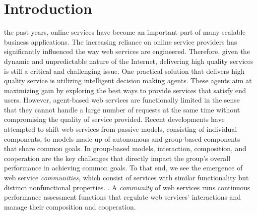 \documentclass[10pt,journal,cspaper,compsoc]{IEEEtran}
\begin{document}
\maketitle


\IEEEdisplaynotcompsoctitleabstractindextext


%
\IEEEpeerreviewmaketitle


\section{Introduction}

 the past years, online services have become an important part of many scalable business applications. The increasing reliance on online service providers has significantly influenced the way web services are engineered. Therefore, given the dynamic and unpredictable nature of the Internet, delivering high quality services is still a critical and challenging issue. One practical solution that delivers high quality service is utilizing intelligent decision making agents. These agents aim at maximizing gain by exploring the best ways to provide services that satisfy end users. However, agent-based web services are functionally limited in the sense that they cannot handle a large number of requests at the same time without compromising the quality of service provided. Recent developments have attempted to shift web services from passive models, consisting of individual components, to models made up of autonomous and group-based components that share common goals. In group-based models, interaction, composition, and cooperation are the key challenges \cite{ICWS2011-1, SCC2011-1, journals/mags/BaldoniBM10, journals/jcss/CasadoYT13} that directly impact the group's overall performance in achieving common goals. To that end, we see the emergence of web service \emph{communities}, which consist of services with similar functionality but distinct nonfunctional properties. \cite{Zeng:2003:QDW:775152.775211, Paik:2005:TSS:2229263.2230038, Medjahed05adynamic, 10.1109/ARES.2008.7}. A \emph{community} of web services runs continuous performance assessment functions that regulate web services' interactions and manage their composition and cooperation.
\end{document}
